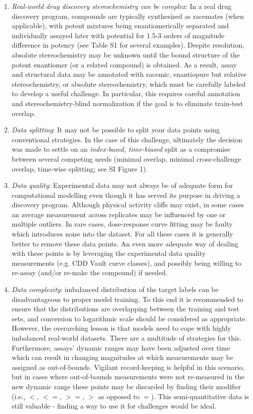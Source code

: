 \documentclass[journal=jcim,manuscript=article]{achemso}
\begin{document}
\begin{enumerate}
    \item \textit{Real-world drug discovery stereochemistry can be complex}: In a real drug discovery program, compounds are typically synthesized as racemates (when applicable), with potent mixtures being enantiomerically separated and individually assayed later with potential for 1.5-3 orders of magnitude difference in potency (see Table S1 for several examples). Despite resolution, absolute stereochemistry may be unknown until the bound structure of the potent enantiomer (or a related compound) is obtained. As a result, assay and structural data may be annotated with racemic, enantiopure but relative stereochemistry, or absolute stereochemistry, which must be carefully labeled to develop a useful challenge. In particular, this requires careful annotation and stereochemistry-blind normalization if the goal is to eliminate train-test overlap.
    \item \textit{Data splitting}: It may not be possible to split your data points using conventional strategies. In the case of this challenge, ultimately the decision was made to settle on an \textit{index-based, time-biased} split as a compromise between several competing needs (minimal overlap, minimal cross-challenge overlap, time-wise splitting; see SI Figure 1). 
    \item \textit{Data quality}: Experimental data may not always be of adequate form for computational modelling even though it has served its purpose in driving a discovery program. Although physical activity cliffs may exist, in some cases an average measurement across replicates may be influenced by one or multiple outliers. In rare cases, dose-response curve fitting may be faulty which introduces noise into the dataset. For all these cases it is generally better to remove these data points. An even more adequate way of dealing with these points is by leveraging the experimental data quality measurements (e.g. CDD Vault curve classes), and possibly being willing to re-assay (and/or re-make the compound) if needed.
    \item \textit{Data complexity}: imbalanced distribution of the target labels can be disadvantageous to proper model training. To this end it is recommended to ensure that the distributions are overlapping between the training and test sets, and conversion to logarithmic scale should be considered as appropriate. However, the overarching lesson is that models need to cope with highly imbalanced real-world datasets. There are a multitude of strategies for this. Furthermore, assays' dynamic ranges may have been adjusted over time which can result in changing magnitudes at which measurements may be assigned as out-of-bounds. Vigilant record-keeping is helpful in this scenario, but in cases where out-of-bounds measurements were not re-measured in the new dynamic range these points may be discarded by finding their modifier (i.e., $<$, $<=$, $>=$, $>$ as opposed to $=$). This semi-quantitative data is still valuable - finding a way to use it for challenges would be ideal.
\end{enumerate}
\end{document}
